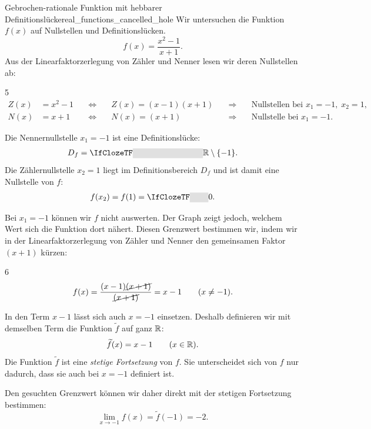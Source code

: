 \begin{ExampleBox}{Gebrochen-rationale Funktion mit hebbarer Definitionslücke}{real_functions_cancelled_hole}
  Wir untersuchen die Funktion $f(x)$ auf Nullstellen und Definitionslücken.
  \[
    f(x)=\frac{x^2-1}{x+1}.
  \]
  Aus der Linearfaktorzerlegung von Zähler und Nenner lesen wir deren Nullstellen ab:
  \begin{ClozeArea}[34]{5}
    \[
      \begin{alignedat}{3}
        Z(x)&=x^2-1
          &\quad\Longleftrightarrow\quad& Z(x)=(x-1)(x+1)
          &\quad\Longrightarrow\quad& \text{Nullstellen bei }x_1=-1,\;x_2=1,\\[0.8em]
        N(x)&=x+1
          &\quad\Longleftrightarrow\quad& N(x)=(x+1)
          &\quad\Longrightarrow\quad& \text{Nullstelle bei }x_1=-1.
      \end{alignedat}
    \]
  \end{ClozeArea}
  \noindent
  \begin{minipage}[c]{0.45\linewidth}
    Die Nennernullstelle $x_1=-1$ ist eine Definitionslücke:
    \[
      D_f=\Cloze{3cm}{\R\setminus\{-1\}}.
    \]
    Die Zählernullstelle $x_2=1$ liegt im Definitionsbereich $D_f$ und ist damit
    eine Nullstelle von $f$:
    \[
      f(x_2)=f(1)=\Cloze{0.8cm}{0}.
    \]
  \end{minipage}\hfill
  \begin{minipage}[c]{0.52\linewidth}
    \centering
  \end{minipage}
  \par\medskip
  Bei $x_1=-1$ können wir $f$ nicht auswerten.
  Der Graph zeigt jedoch, welchem Wert sich die Funktion dort nähert.
  Diesen Grenzwert bestimmen wir, indem wir in der Linearfaktorzerlegung von
  Zähler und Nenner den gemeinsamen Faktor $(x+1)$ kürzen:
  \begin{ClozeArea}[34]{6}
    \[
      f(x)=\frac{(x-1)\cancel{(x+1)}}{\cancel{(x+1)}}=x-1\qquad(x\ne-1).
    \]
  \end{ClozeArea}
  In den Term $x-1$ lässt sich auch $x=-1$ einsetzen.
  Deshalb definieren wir mit demselben Term die Funktion $\widetilde f$ auf ganz $\mathbb{R}$:
  \[
    \widetilde f(x)=x-1 \qquad(x\in\mathbb{R}).
  \]
  Die Funktion $\widetilde f$ ist eine \emph{stetige Fortsetzung}
   von $f$.
  Sie unterscheidet sich von $f$ nur dadurch, dass sie auch bei $x=-1$ definiert ist.

  Den gesuchten Grenzwert können wir daher direkt mit der stetigen Fortsetzung bestimmen:
  \[
    \lim_{x\to-1}f(x)=\widetilde f(-1)=-2.
  \]
\end{ExampleBox}
